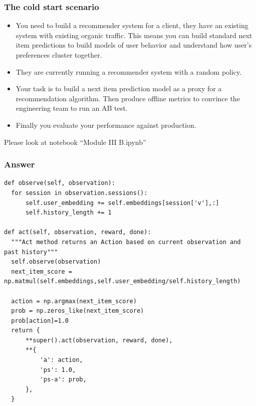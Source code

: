
\begin{frame}
  \frametitle{The cold start scenario}

    \begin{itemize}
      \item You need to build a recommender system for a client, they have an existing system with existing organic traffic.  \pause This means you can build standard next item predictions to build models of user behavior and understand how user's preferences cluster together. \pause
      \item They are currently running a recommender system with a random policy. \pause
      \item Your task is to build a next item prediction model as a proxy for a recommendation algorithm.  Then produce offline metrics to convince the engineering team to run an AB test.\pause
      \item Finally you evaluate your performance against production.
    \end{itemize}

    \pause
    Please look at notebook ``Module III B.ipynb''

\end{frame}



\begin{frame}[fragile]
  \frametitle{Answer}
\begin{tiny}  
\begin{verbatim}
def observe(self, observation):
  for session in observation.sessions():
      self.user_embedding += self.embeddings[session['v'],:]
      self.history_length += 1

def act(self, observation, reward, done):
  """Act method returns an Action based on current observation and past history"""
  self.observe(observation)
  next_item_score = np.matmul(self.embeddings,self.user_embedding/self.history_length)

  action = np.argmax(next_item_score)        
  prob = np.zeros_like(next_item_score)
  prob[action]=1.0
  return {
      **super().act(observation, reward, done),
      **{
          'a': action,
          'ps': 1.0,
          'ps-a': prob,
      },
  }
\end{verbatim}
\end{tiny}
\end{frame}




